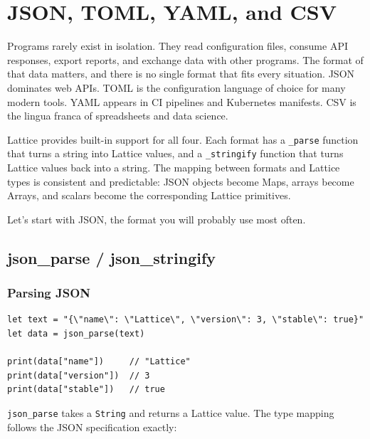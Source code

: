 \chapter{JSON, TOML, YAML, and CSV}\label{ch:data-formats}


Programs rarely exist in isolation. They read configuration files, consume
API responses, export reports, and exchange data with other programs. The
format of that data matters, and there is no single format that fits every
situation. JSON dominates web APIs. TOML is the configuration language of
choice for many modern tools. YAML appears in CI pipelines and Kubernetes
manifests. CSV is the lingua franca of spreadsheets and data science.

Lattice provides built-in support for all four. Each format has a
\lstinline|_parse| function that turns a string into Lattice values, and a
\lstinline|_stringify| function that turns Lattice values back into a string.
The mapping between formats and Lattice types is consistent and predictable:
JSON objects become Maps, arrays become Arrays, and scalars become the
corresponding Lattice primitives.

Let's start with JSON, the format you will probably use most often.

\section{json\_parse / json\_stringify}\label{sec:json}


\subsection{Parsing JSON}

\begin{lstlisting}[language=Lattice, caption={Parsing a JSON string}]
let text = "{\"name\": \"Lattice\", \"version\": 3, \"stable\": true}"
let data = json_parse(text)

print(data["name"])     // "Lattice"
print(data["version"])  // 3
print(data["stable"])   // true
\end{lstlisting}

\lstinline|json_parse| takes a \lstinline|String| and returns a Lattice value.
The type mapping follows the JSON specification exactly:

